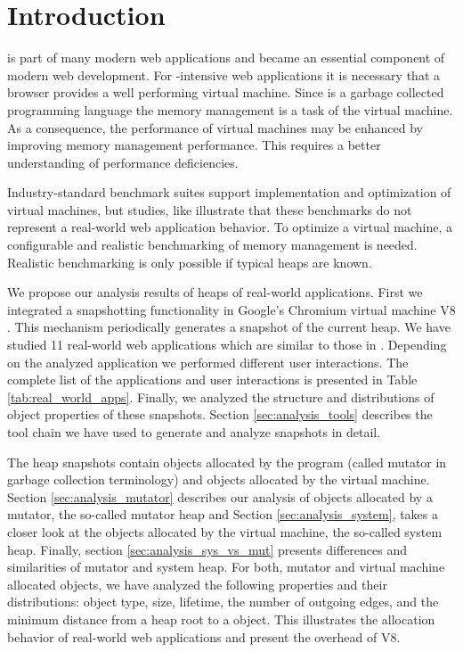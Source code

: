 
\section{Introduction}

\JS is part of many modern web applications and became an essential component
of modern web development. For \JS-intensive web applications it is
necessary that a browser provides a well performing \JS virtual machine. Since
\JS is a garbage collected programming language the memory management is a task
of the virtual machine. As a consequence, the performance of \JS virtual
machines may be enhanced by improving memory management performance. This
requires a better understanding of performance deficiencies.

Industry-standard benchmark suites support implementation and optimization of
\JS virtual machines, but studies, like \cite{JSMeter2009} illustrate that
these benchmarks do not represent a real-world web application behavior. To
optimize a \JS virtual machine, a configurable and realistic benchmarking of
memory management is needed. Realistic benchmarking is only possible if typical
\JS heaps are known.

We propose our analysis results of \JS heaps of real-world applications. First
we integrated a snapshotting functionality in Google's Chromium \cite{Chromium}
virtual machine V8 \cite{V8}. This mechanism periodically generates a snapshot
of the current \JS heap. We have studied 11 real-world web applications which
are similar to those in \cite{JSMeter2009}. Depending on the analyzed
application we performed different user interactions. The complete list of the
applications and user interactions is presented in Table
\ref{tab:real_world_apps}. Finally, we analyzed the structure and distributions
of object properties of these snapshots. Section \ref{sec:analysis_tools}
describes the tool chain we have used to generate and analyze snapshots in
detail.

The heap snapshots contain objects allocated by the \JS program (called mutator
in garbage collection terminology) and objects allocated by the virtual
machine. Section \ref{sec:analysis_mutator} describes our analysis of objects
allocated by a mutator, the so-called mutator heap and Section
\ref{sec:analysis_system}, takes a closer look at the objects allocated by the
virtual machine, the so-called system heap. Finally, section
\ref{sec:analysis_sys_vs_mut} presents differences and similarities of mutator
and system heap. For both, mutator and virtual machine allocated objects, we
have analyzed the following properties and their distributions: object type,
size, lifetime, the number of outgoing edges, and the minimum distance from a
heap root to a object. This illustrates the allocation behavior of real-world
web applications and present the overhead of V8.

